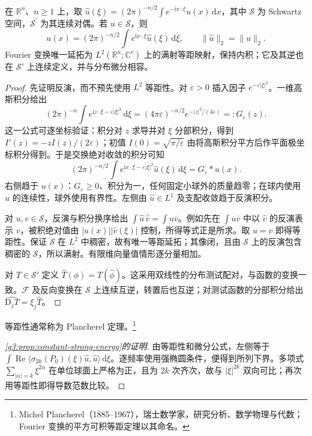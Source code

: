 \begin{theorem}\label{g3:thm:fourier-plancherel}
	在 \(\mathbb R^n\)、\(n\ge1\) 上，取 \(\widehat u(\xi)=(2\pi)^{-n/2}\int e^{-\mathrm ix\cdot\xi}u(x)\,\mathrm dx\)，其中 \(\mathcal S\) 为 Schwartz 空间，\(\mathcal S^\prime\) 为其连续对偶。若 \(u\in\mathcal S\)，则
	\[
		u(x)=(2\pi)^{-n/2}\int e^{\mathrm ix\cdot\xi}\widehat u(\xi)\,\mathrm d\xi,
		\qquad \|\widehat u\|_2=\|u\|_2.
	\]
	Fourier 变换唯一延拓为 \(L^2(\mathbb R^n;\mathbb C^r)\) 上的满射等距映射，保持内积；它及其逆也在 \(\mathcal S'\) 上连续定义，并与分布微分相容。
\end{theorem}
\begin{proof}
	先证明反演，而不预先使用 \(L^2\) 等距性。对 \(\varepsilon>0\) 插入因子 \(e^{-\varepsilon|\xi|^2}\)。一维高斯积分给出
	\[
		(2\pi)^{-n}\int e^{\mathrm iz\cdot\xi-\varepsilon|\xi|^2}\,\mathrm d\xi
		=(4\pi\varepsilon)^{-n/2}e^{-|z|^2/(4\varepsilon)}=:G_\varepsilon(z).
	\]
	这一公式可逐坐标验证：积分对 \(z\) 求导并对 \(\xi\) 分部积分，得到 \(I'(z)=-zI(z)/(2\varepsilon)\)；初值 \(I(0)=\sqrt{\pi/\varepsilon}\) 由将高斯积分平方后作平面极坐标积分得到。于是交换绝对收敛的积分可知
	\[
		(2\pi)^{-n/2}\int e^{\mathrm ix\cdot\xi-\varepsilon|\xi|^2}\widehat u(\xi)\,\mathrm d\xi
		=G_\varepsilon*u(x).
	\]
	右侧趋于 \(u(x)\)：\(G_\varepsilon\ge0\)、积分为一，任何固定小球外的质量趋零；在球内使用 \(u\) 的连续性，球外使用有界性。左侧由 \(\widehat u\in L^1\) 及支配收敛趋于反演积分。

	对 \(u,v\in\mathcal S\)，反演与积分换序给出
	\(\int\widehat u\,\overline{\widehat v}=\int u\overline v\)。例如先在 \(\int u\overline v\) 中以 \(\widehat v\) 的反演表示 \(v\)，被积绝对值由 \(|u(x)||\widehat v(\xi)|\) 控制，所得等式正是所求。取 \(u=v\) 即得等距性。保证 \(\mathcal S\) 在 \(L^2\) 中稠密，故有唯一等距延拓；其像闭，且由 \(\mathcal S\) 上的反演包含稠密的 \(\mathcal S\)，所以满射。有限维向量值情形逐分量相加。

	对 \(T\in\mathcal S'\) 定义 \(\widehat T(\phi)=T(\widehat\phi)\)。这采用双线性的分布测试配对，与函数的变换一致。\(\mathcal F\) 及反向变换在 \(\mathcal S\) 上连续互逆，转置后也互逆；对测试函数的分部积分给出 \(\widehat{\mathrm D_jT}=\xi_j\widehat T\)。
\end{proof}

等距性通常称为 Plancherel 定理。\footnote{Michel Plancherel（1885--1967），瑞士数学家，研究分析、数学物理与代数；Fourier 变换的平方可积等距定理以其命名。}

\begin{proof}[\cref{g3:prop:constant-strong-energy}的证明]
	由等距性和微分公式，左侧等于
	\(\int\operatorname{Re}\langle\sigma_{2k}(P_0)(\xi)\widehat u,\widehat u\rangle\,\mathrm d\xi\)。逐频率使用强椭圆条件，便得到所列下界。多项式 \(\sum_{|\alpha|=k}\xi^{2\alpha}\) 在单位球面上严格为正，且为 \(2k\) 次齐次，故与 \(|\xi|^{2k}\) 双向可比；再次用等距性即得导数范数比较。
\end{proof}

